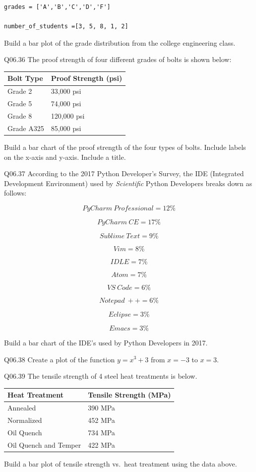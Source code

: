 \documentclass{book}
\newenvironment{problems}{}{}  %
\begin{document}
\begin{problems}
\begin{lstlisting}
grades = ['A','B','C','D','F']

number_of_students =[3, 5, 8, 1, 2]
\end{lstlisting}

Build a bar plot of the grade distribution from the college engineering
class.

Q06.36 The proof strength of four different grades of bolts is shown
below:

\begin{longtable}[]{@{}ll@{}}
\toprule
Bolt Type & Proof Strength (psi)\tabularnewline
\midrule
\endhead
Grade 2 & 33,000 psi\tabularnewline
Grade 5 & 74,000 psi\tabularnewline
Grade 8 & 120,000 psi\tabularnewline
Grade A325 & 85,000 psi\tabularnewline
\bottomrule
\end{longtable}

Build a bar chart of the proof strength of the four types of bolts.
Include labels on the x-axis and y-axis. Include a title.

Q06.37 According to the 2017 Python Developer's Survey, the IDE
(Integrated Development Environment) used by \emph{Scientific} Python
Developers breaks down as follows:

\[ PyCharm \ Professional = 12\% \]

\[ PyCharm \ CE = 17\% \]

\[ Sublime \ Text = 9\% \]

\[ Vim = 8\% \]

\[ IDLE = 7\% \]

\[ Atom = 7\% \]

\[ VS \ Code = 6\% \]

\[ Notepad \ ++ = 6\% \]

\[ Eclipse = 3\% \]

\[ Emacs = 3\% \]

Build a bar chart of the IDE's used by Python Developers in 2017.

Q06.38 Create a plot of the function \(y=x^3+3\) from \(x=-3\) to
\(x=3\).

Q06.39 The tensile strength of 4 steel heat treatments is below.

\begin{longtable}[]{@{}ll@{}}
\toprule
Heat Treatment & Tensile Strength (MPa)\tabularnewline
\midrule
\endhead
Annealed & 390 MPa\tabularnewline
Normalized & 452 MPa\tabularnewline
Oil Quench & 734 MPa\tabularnewline
Oil Quench and Temper & 422 MPa\tabularnewline
\bottomrule
\end{longtable}

Build a bar plot of tensile strength vs.~heat treatment using the data
above.
        \end{problems}
\end{document}
